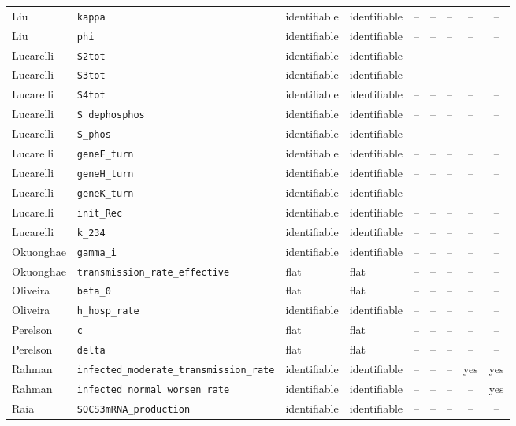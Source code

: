 \begin{longtable}{@{}llllccccc@{}}
Liu & \texttt{kappa} & identifiable & identifiable & -- & -- & -- & -- & -- \\
Liu & \texttt{phi} & identifiable & identifiable & -- & -- & -- & -- & -- \\
Lucarelli & \texttt{S2tot} & identifiable & identifiable & -- & -- & -- & -- & -- \\
Lucarelli & \texttt{S3tot} & identifiable & identifiable & -- & -- & -- & -- & -- \\
Lucarelli & \texttt{S4tot} & identifiable & identifiable & -- & -- & -- & -- & -- \\
Lucarelli & \texttt{S\_dephosphos} & identifiable & identifiable & -- & -- & -- & -- & -- \\
Lucarelli & \texttt{S\_phos} & identifiable & identifiable & -- & -- & -- & -- & -- \\
Lucarelli & \texttt{geneF\_turn} & identifiable & identifiable & -- & -- & -- & -- & -- \\
Lucarelli & \texttt{geneH\_turn} & identifiable & identifiable & -- & -- & -- & -- & -- \\
Lucarelli & \texttt{geneK\_turn} & identifiable & identifiable & -- & -- & -- & -- & -- \\
Lucarelli & \texttt{init\_Rec} & identifiable & identifiable & -- & -- & -- & -- & -- \\
Lucarelli & \texttt{k\_234} & identifiable & identifiable & -- & -- & -- & -- & -- \\
Okuonghae & \texttt{gamma\_i} & identifiable & identifiable & -- & -- & -- & -- & -- \\
Okuonghae & \texttt{transmission\_rate\_effective} & flat & flat & -- & -- & -- & -- & -- \\
Oliveira & \texttt{beta\_0} & flat & flat & -- & -- & -- & -- & -- \\
Oliveira & \texttt{h\_hosp\_rate} & identifiable & identifiable & -- & -- & -- & -- & -- \\
Perelson & \texttt{c} & flat & flat & -- & -- & -- & -- & -- \\
Perelson & \texttt{delta} & flat & flat & -- & -- & -- & -- & -- \\
Rahman & \texttt{infected\_moderate\_transmission\_rate} & identifiable & identifiable & -- & -- & -- & yes & yes \\
Rahman & \texttt{infected\_normal\_worsen\_rate} & identifiable & identifiable & -- & -- & -- & -- & yes \\
Raia & \texttt{SOCS3mRNA\_production} & identifiable & identifiable & -- & -- & -- & -- & -- \\

\end{longtable}
